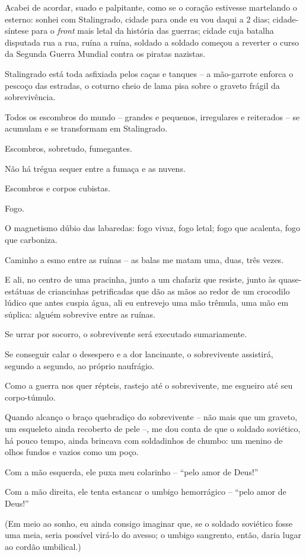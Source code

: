 Acabei de acordar, suado e palpitante, como se o coração estivesse
martelando o esterno: sonhei com Stalingrado, cidade para onde eu vou
daqui a 2 dias; cidade-síntese para o \emph{front} mais letal da
história das guerras; cidade cuja batalha disputada rua a rua, ruína a
ruína, soldado a soldado começou a reverter o curso da Segunda Guerra
Mundial contra os piratas nazistas.

Stalingrado está toda asfixiada pelos caças e tanques -- a mão-garrote
enforca o pescoço das estradas, o coturno cheio de lama pisa sobre o
graveto frágil da sobrevivência.

Todos os escombros do mundo -- grandes e pequenos, irregulares e
reiterados -- se acumulam e se transformam em Stalingrado.

Escombros, sobretudo, fumegantes.

Não há trégua sequer entre a fumaça e as nuvens.

Escombros e corpos cubistas.

Fogo.

O magnetismo dúbio das labaredas: fogo vivaz, fogo letal; fogo que
acalenta, fogo que carboniza.

Caminho a esmo entre as ruínas -- as balas me matam uma, duas, três
vezes.

E ali, no centro de uma pracinha, junto a um chafariz que resiste, junto
às quase-estátuas de criancinhas petrificadas que dão as mãos ao redor
de um crocodilo lúdico que antes cuspia água, ali eu entrevejo uma mão
trêmula, uma mão em súplica: alguém sobrevive entre as ruínas.

Se urrar por socorro, o sobrevivente será executado sumariamente.

Se conseguir calar o desespero e a dor lancinante, o sobrevivente
assistirá, segundo a segundo, ao próprio naufrágio.

Como a guerra nos quer répteis, rastejo até o sobrevivente, me esgueiro
até seu corpo-túmulo.

Quando alcanço o braço quebradiço do sobrevivente -- não mais que um
graveto, um esqueleto ainda recoberto de pele --, me dou conta de que o
soldado soviético, há pouco tempo, ainda brincava com soldadinhos de
chumbo: um menino de olhos fundos e vazios como um poço.

Com a mão esquerda, ele puxa meu colarinho -- ``pelo amor de Deus!''

Com a mão direita, ele tenta estancar o umbigo hemorrágico -- ``pelo
amor de Deus!''

(Em meio ao sonho, eu ainda consigo imaginar que, se o soldado soviético
fosse uma meia, seria possível virá-lo do avesso; o umbigo sangrento,
então, daria lugar ao cordão umbilical.)

